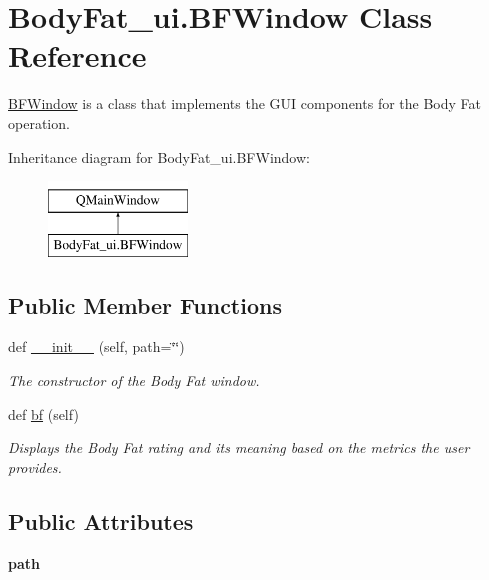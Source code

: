\hypertarget{class_body_fat__ui_1_1_b_f_window}{}\section{Body\+Fat\+\_\+ui.\+B\+F\+Window Class Reference}
\label{class_body_fat__ui_1_1_b_f_window}


\hyperlink{class_body_fat__ui_1_1_b_f_window}{B\+F\+Window} is a class that implements the G\+UI components for the Body Fat operation.  


Inheritance diagram for Body\+Fat\+\_\+ui.\+B\+F\+Window\+:\begin{figure}[H]
\begin{center}
\leavevmode
\includegraphics[height=2.000000cm]{class_body_fat__ui_1_1_b_f_window}
\end{center}
\end{figure}
\subsection*{Public Member Functions}
\begin{DoxyCompactItemize}
\item 
def \hyperlink{class_body_fat__ui_1_1_b_f_window_a3ee0d136b0b25e045fd9a8a6356819b1}{\+\_\+\+\_\+init\+\_\+\+\_\+} (self, path=\char`\"{}\char`\"{})
\begin{DoxyCompactList}\small\item\em The constructor of the Body Fat window. \end{DoxyCompactList}\item 
def \hyperlink{class_body_fat__ui_1_1_b_f_window_a1c3b98d97dc41255235c5e739980b16f}{bf} (self)
\begin{DoxyCompactList}\small\item\em Displays the Body Fat rating and its meaning based on the metrics the user provides. \end{DoxyCompactList}\end{DoxyCompactItemize}
\subsection*{Public Attributes}
\begin{DoxyCompactItemize}
\item 
\mbox{\label{class_body_fat__ui_1_1_b_f_window_a22747b4a05d316e1ac4d9421051427b5}} 
{\bfseries path}
\end{DoxyCompactItemize}



